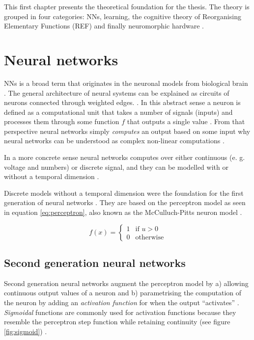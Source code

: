 \documentclass[report.tex]{subfiles}
\begin{document}
This first chapter presents the theoretical foundation for the thesis.
The theory is grouped in four categories: \gls{NN}s, learning,
the cognitive theory of Reorganising Elementary Functions
(\gls{REF}) and finally neuromorphic hardware
.

\section{Neural networks} \label{sec:nn}
\Gls{NN}s is a broad term that originates in the neuronal models from
biological brain \cite{Dayan2001}.
The general architecture of neural systems can be explained as circuits
of neurons  connected through weighted edges.
\cite{Russel2007, Dayan2001}.
In this abstract sense a neuron is defined as a computational unit that
takes a number of signals (inputs) and processes them through some
function $f$ that outputs a single value \cite{Eliasmith2004}.
From that perspective neural networks simply \textit{computes} an 
output based on some input why neural networks can be understood as
complex non-linear computations \cite{Eliasmith2004, Dayan2001}.

In a more concrete sense neural networks computes over either
continuous (e. g. voltage and numbers) or discrete signal, and they
can be modelled with or without a temporal dimension
\cite{Eliasmith2004, Russel2007, Schmidhuber2014}.

Discrete models without a temporal dimension were the foundation for
the first generation of neural networks \cite{Russel2007, Maass1997}.
They are based on the perceptron model as seen in equation
\ref{eq:perceptron}, also known as the McCulluch-Pitts neuron model
\cite{Eliasmith2004}.

\begin{equation} \label{eq:perceptron}
f(x) = \begin{cases}
	 1 & \text{if } u > 0\\
	 0 & \text{otherwise}
       \end{cases}
\end{equation}

\subsection{Second generation neural networks}
Second generation neural networks augment the perceptron model by
a) allowing continuous output values of a neuron and b) parametrising
the computation of the neuron by adding an \textit{activation function}
 for when the output ``activates'' 
\cite{Maass1997}.
\textit{Sigmoidal} functions are commonly used for activation functions
because they resemble the perceptron step function while 
retaining continuity (see figure \ref{fig:sigmoid})
\cite{Maass1997}.
\end{document}
